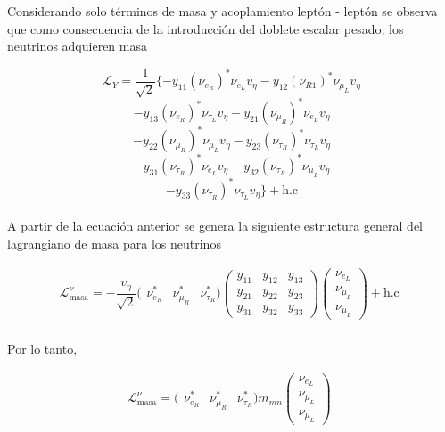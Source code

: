 \documentclass[12pt]{article}
\begin{document}
Considerando solo términos de masa y acoplamiento leptón - leptón se
observa que como consecuencia de la introducción del doblete escalar pesado, los neutrinos adquieren masa


\begin{equation}
         \mathcal{L}_Y = \frac{1}{\sqrt{2}} \{ -y_{11} (\nu_{e_R})^* \nu_{e_L} v_\eta -y_{12} (\nu_{R1})^* \nu_{\mu_L} v_\eta       
    \end{equation}
\[ -y_{13} (\nu_{e_R})^* \nu_{\tau_L} v_\eta-y_{21} (\nu_{\mu_R})^* \nu_{e_L} v_\eta\] 
\[-y_{22} (\nu_{\mu_R})^* \nu_{\mu_L} v_\eta -y_{23} (\nu_{\tau_R})^* \nu_{\tau_L} v_\eta \]
\[   -y_{31} (\nu_{\tau_R})^* \nu_{e_L} v_\eta-y_{32} (\nu_{\tau_R})^* \nu_{\mu_L} v_\eta \] 
\[  -y_{33} (\nu_{\tau_R})^* \nu_{\tau_L} v_\eta  \} + \text{h.c}
\] \\
  
A partir de la ecuación anterior se genera la siguiente estructura general del lagrangiano de masa para los neutrinos


\begin{equation*}
    \mathcal{L}^\nu_{\text{masa}}= - \frac{v_\eta}{\sqrt{2}} (\begin{array}{ccc}
         {\nu}^*_{e_R} & {\nu}^*_{\mu_R} & {\nu}^*_{\tau_R} )\begin{pmatrix}    y_{11} &  y_{12} & y_{13} \\
         y_{21} &  y_{22} & y_{23}  \\
         y_{31} &  y_{32} & y_{33}  \end{pmatrix} 
  \begin{pmatrix}
         \nu_{e_L} \\
         \nu_{\mu_L} \\
         \nu_{\mu_L} 
    \end{pmatrix} + \text{h.c}
    \end{array}
    \label{eq:Yukawa}
\end{equation*} \\

 Por lo tanto, 


\begin{equation}
\label{eq:lang}
    \mathcal{L}^\nu_{\text{masa}}= (\begin{array}{ccc}
         {\nu}^*_{e_R} & {\nu}^*_{\mu_R} & {\nu}^*_{\tau_R} ) m_{mn} \begin{pmatrix}
        \nu_{e_L} \\
         \nu_{\mu_L} \\
         \nu_{\mu_L}
    \end{pmatrix} 
    \end{array} 
\end{equation} 
\end{document}
